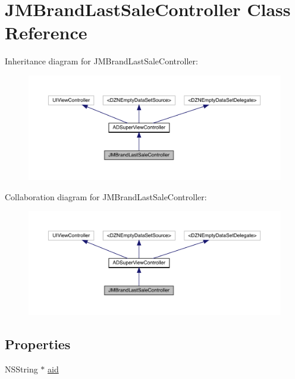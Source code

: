 \hypertarget{interface_j_m_brand_last_sale_controller}{}\section{J\+M\+Brand\+Last\+Sale\+Controller Class Reference}
\label{interface_j_m_brand_last_sale_controller}


Inheritance diagram for J\+M\+Brand\+Last\+Sale\+Controller\+:\nopagebreak
\begin{figure}[H]
\begin{center}
\leavevmode
\includegraphics[width=350pt]{interface_j_m_brand_last_sale_controller__inherit__graph}
\end{center}
\end{figure}


Collaboration diagram for J\+M\+Brand\+Last\+Sale\+Controller\+:\nopagebreak
\begin{figure}[H]
\begin{center}
\leavevmode
\includegraphics[width=350pt]{interface_j_m_brand_last_sale_controller__coll__graph}
\end{center}
\end{figure}
\subsection*{Properties}
\begin{DoxyCompactItemize}
\item 
N\+S\+String $\ast$ \mbox{\hyperlink{interface_j_m_brand_last_sale_controller_aa8ddd735e8e2ff6ec7d61c32b864519d}{aid}}
\end{DoxyCompactItemize}

